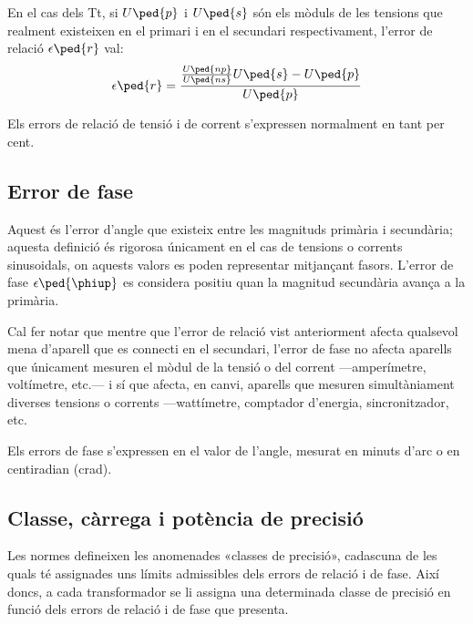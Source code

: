 En el cas dels Tt, si $U\ped{p}$ i $U\ped{s}$ són els mòduls de les tensions que
realment existeixen en el primari i en el secundari respectivament,
l'error de relació $\epsilon\ped{r}$ val:
\begin{equation}
    \epsilon\ped{r} = \frac{\frac{U\ped{np}}{U\ped{ns}} U\ped{s} - U\ped{p}} {U\ped{p}}
\end{equation}

Els errors de relació de tensió i de corrent s'expressen
normalment en tant per cent.

\subsection{Error de fase}

Aquest és l'error d'angle  que existeix entre les magnituds primària i
secundària; aquesta definició és rigorosa únicament en el cas de
tensions o corrents sinusoidals, on aquests valors es poden
representar mitjançant fasors. L'error de fase $\epsilon\ped{\phiup}$ es considera positiu quan la magnitud secundària avança a la primària.
\index{$\epsilon\ped{\phiup}$}

 Cal fer notar que mentre que l'error de relació
vist anteriorment afecta qualsevol mena d'aparell que es
connecti en el secundari, l'error de fase no afecta aparells que
únicament mesuren el mòdul de la tensió o del corrent ---amperímetre,
voltímetre, etc.--- i sí que afecta, en canvi, aparells que mesuren
simultàniament diverses tensions o corrents ---wattímetre, comptador
d'energia, sincronitzador, etc.

Els errors de fase s'expressen en el valor de l'angle, mesurat en
minuts d'arc o en centiradian (crad).

\subsection{Classe, càrrega i potència de precisió}

Les normes defineixen les anomenades «classes de precisió»,
cadascuna de les quals té assignades uns límits admissibles dels
errors de relació i de fase. Així doncs, a cada transformador
se li assigna una determinada classe de precisió en funció dels errors
de relació i de fase que presenta.

